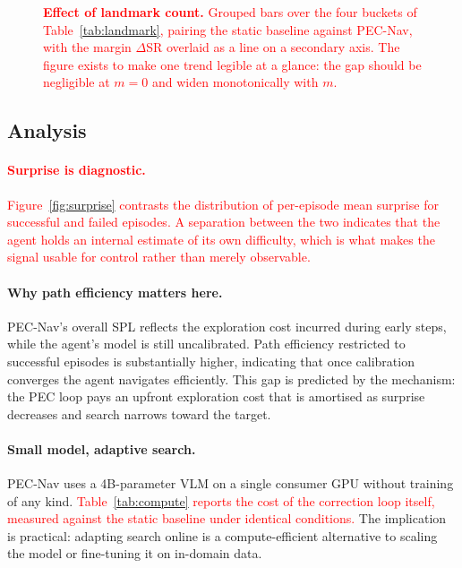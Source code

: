 \textcolor{red}{
\begin{figure}[H]
\centering
\plotbox{4.4cm}
\caption{\textcolor{red}{\textbf{Effect of landmark count.} Grouped bars over the four buckets of Table~\ref{tab:landmark}, pairing the static baseline against PEC-Nav, with the margin $\Delta$SR overlaid as a line on a secondary axis. The figure exists to make one trend legible at a glance: the gap should be negligible at $m=0$ and widen monotonically with $m$.}}
\label{fig:landmark}
\end{figure}
}

\subsection{Analysis}

\textcolor{red}{\paragraph{Surprise is diagnostic.} Figure~\ref{fig:surprise} contrasts the distribution of per-episode mean surprise for successful and failed episodes. A separation between the two indicates that the agent holds an internal estimate of its own difficulty, which is what makes the signal usable for control rather than merely observable.}

\paragraph{Why path efficiency matters here.} PEC-Nav's overall SPL reflects the exploration cost incurred during early steps, while the agent's model is still uncalibrated. Path efficiency restricted to successful episodes is substantially higher, indicating that once calibration converges the agent navigates efficiently. This gap is predicted by the mechanism: the PEC loop pays an upfront exploration cost that is amortised as surprise decreases and search narrows toward the target.

\paragraph{Small model, adaptive search.} PEC-Nav uses a 4B-parameter VLM on a single consumer GPU without training of any kind. \textcolor{red}{Table~\ref{tab:compute} reports the cost of the correction loop itself, measured against the static baseline under identical conditions.} The implication is practical: adapting search online is a compute-efficient alternative to scaling the model or fine-tuning it on in-domain data.

